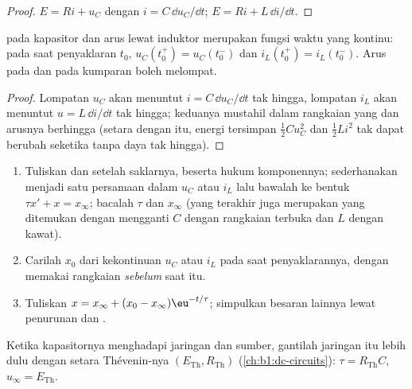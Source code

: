 \begin{proof}
 $E = Ri + u_C$ dengan $i = C\,\dd u_C/\dd t$; 
$E = Ri + L\,\dd i/\dd t$.
\end{proof}

\begin{proposition}\label{prop:b1:transient-regimes:continuity}
 pada kapasitor dan arus lewat induktor merupakan fungsi waktu
yang kontinu: pada saat penyaklaran $t_0$,
$u_C(t_0^+) = u_C(t_0^-)$ dan $i_L(t_0^+) = i_L(t_0^-)$. Arus pada
 dan  pada kumparan boleh melompat.
\end{proposition}

\begin{proof}
Lompatan $u_C$ akan menuntut $i = C\,\dd u_C/\dd t$ tak hingga,
lompatan $i_L$ akan menuntut $u = L\,\dd i/\dd t$ tak hingga; keduanya
mustahil dalam rangkaian yang  dan arusnya berhingga (setara
dengan itu, energi tersimpan $\tfrac12 Cu_C^2$ dan $\tfrac12 Li^2$ tak
dapat berubah seketika tanpa daya tak hingga).
\end{proof}

\begin{method}\label{met:b1:transient-regimes:first}
\begin{enumerate}
  \item Tuliskan  dan  setelah saklarnya,
        beserta hukum komponennya; sederhanakan menjadi satu persamaan
        dalam $u_C$ atau $i_L$ lalu bawalah ke bentuk
        $\tau x' + x = x_\infty$; bacalah $\tau$ dan $x_\infty$ (yang
        terakhir juga merupakan  yang ditemukan dengan
        mengganti $C$ dengan rangkaian terbuka dan $L$ dengan kawat).
  \item Carilah $x_0$ dari kekontinuan $u_C$ atau $i_L$ pada saat
        penyaklarannya, dengan memakai rangkaian \emph{sebelum} saat itu.
  \item Tuliskan $x = x_\infty + (x_0 - x_\infty)\eu^{-t/\tau}$;
        simpulkan besaran lainnya lewat penurunan dan .
\end{enumerate}
Ketika kapasitornya menghadapi jaringan  dan sumber, gantilah
jaringan itu lebih dulu dengan setara Thévenin-nya
$(E_{\mathrm{Th}}, R_{\mathrm{Th}})$ (\cref{ch:b1:dc-circuits}):
$\tau = R_{\mathrm{Th}}C$, $u_\infty = E_{\mathrm{Th}}$.
\end{method}

